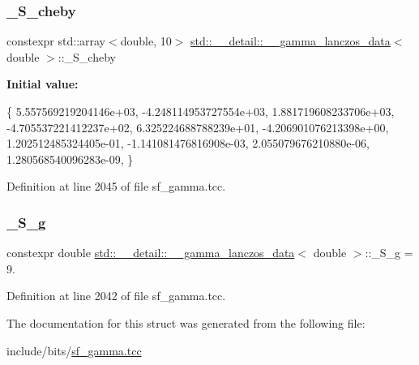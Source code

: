 \subsubsection{\texorpdfstring{\+\_\+\+S\+\_\+cheby}{\_S\_cheby}}
{\footnotesize\ttfamily constexpr std\+::array$<$double, 10$>$ \hyperlink{structstd_1_1____detail_1_1____gamma__lanczos__data}{std\+::\+\_\+\+\_\+detail\+::\+\_\+\+\_\+gamma\+\_\+lanczos\+\_\+data}$<$ double $>$\+::\+\_\+\+S\+\_\+cheby\hspace{0.3cm}{\ttfamily [static]}}

{\bfseries Initial value\+:}
\begin{DoxyCode}
\{
     5.557569219204146e+03,
    -4.248114953727554e+03,
     1.881719608233706e+03,
    -4.705537221412237e+02,
     6.325224688788239e+01,
    -4.206901076213398e+00,
     1.202512485324405e-01,
    -1.141081476816908e-03,
     2.055079676210880e-06,
     1.280568540096283e-09,
      \}
\end{DoxyCode}


Definition at line 2045 of file sf\+\_\+gamma.\+tcc.

\mbox{\label{structstd_1_1____detail_1_1____gamma__lanczos__data_3_01double_01_4_ab7959ed84fcc00db67df8b167165513d}} 
\subsubsection{\texorpdfstring{\+\_\+\+S\+\_\+g}{\_S\_g}}
{\footnotesize\ttfamily constexpr double \hyperlink{structstd_1_1____detail_1_1____gamma__lanczos__data}{std\+::\+\_\+\+\_\+detail\+::\+\_\+\+\_\+gamma\+\_\+lanczos\+\_\+data}$<$ double $>$\+::\+\_\+\+S\+\_\+g = 9.\hspace{0.3cm}{\ttfamily [static]}}



Definition at line 2042 of file sf\+\_\+gamma.\+tcc.



The documentation for this struct was generated from the following file\+:\begin{DoxyCompactItemize}
\item 
include/bits/\hyperlink{sf__gamma_8tcc}{sf\+\_\+gamma.\+tcc}\end{DoxyCompactItemize}
